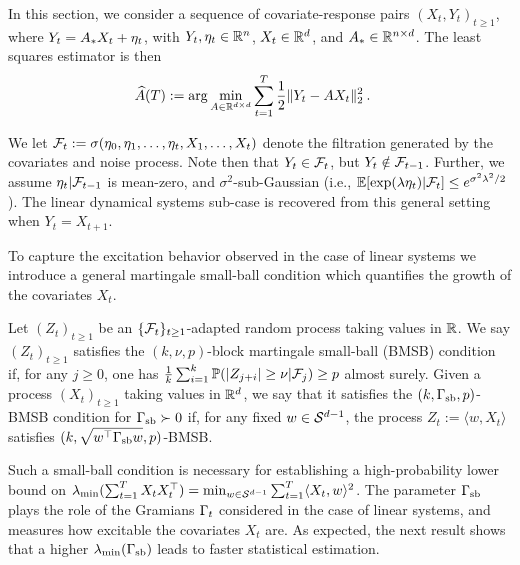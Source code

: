     In this section, we consider a sequence of covariate-response pairs $(X_t,Y_t)_{t \ge 1}$, where $Y_t = A_{*} X_t + \eta_t$, with $Y_t, \eta_t \in \mathbb{R}^n$, $X_t \in \mathbb{R}^d$, and $A_{*} \in \mathbb{R}^{n \times d}$. The least squares estimator is then
    \begin{eqnarray}
    \widehat{A}(T) &:= \arg\min_{A \in \mathbb{R}^{d \times d}} \sum_{t=1}^T \frac{1}{2}\|Y_{t} - A X_t\|_2^2 \:.
    \end{eqnarray}

    We let $\mathcal{F}_{t} := \sigma(\eta_0,\eta_1,\dots,\eta_{t},X_1,\dots,X_t)$ denote the filtration generated by the covariates and noise process. Note then that $Y_t \in \mathcal{F}_{t}$, but $Y_t \notin \mathcal{F}_{t - 1}$. Further, we assume $\eta_t | \mathcal{F}_{t-1}$ is mean-zero, and $\sigma^2$-sub-Gaussian (i.e., $\mathbb{E}[\exp(\lambda \eta_t) | \mathcal{F}_t] \le e^{\sigma^2 \lambda^2/2}$).
    The linear dynamical systems sub-case is recovered from this general setting when $Y_t = X_{t+1}$.

%
%

%
    To capture the excitation behavior observed in the case of linear systems we introduce a general martingale small-ball condition which quantifies the growth of the covariates $X_t$.
	\begin{defn}\label{def:bmsb} Let $(Z_t)_{t \ge 1}$ be an $\{\mathcal{F}_t\}_{t \ge 1}$-adapted random process  taking values in $\mathbb{R}$. We say $(Z_t)_{t\ge 1}$ satisfies the $(k,\nu,p)$-block martingale small-ball (BMSB) condition if, for any $j \ge 0$, one has $\frac{1}{k}\sum_{i=1}^k \mathbb{P}( |Z_{j+i}| \ge \nu | \mathcal{F}_{j}) \ge p$ almost surely.  Given a process $(X_t)_{t \ge 1}$ taking values in $\mathbb{R}^d$, we say that it satisfies the $(k,\Gamma_{\mathrm{sb}},p)$-BMSB condition for $\Gamma_{\mathrm{sb}} \succ 0$ if, for any fixed $w\in \mathcal{S}^{d-1}$, the process $Z_t:= \langle w, X_t\rangle$ satisfies $(k,\sqrt{w^\top \Gamma_{\mathrm{sb}} w},p)$-BMSB.
	\end{defn}

	Such a small-ball condition is necessary for establishing a high-probability lower bound on $\lambda_{\min}(\sum_{t=1}^T X_tX_t^\top) = \min_{w \in \mathcal{S}^{d-1}} \sum_{t=1}^T \langle X_t, w \rangle^2$. The parameter $\Gamma_{\mathrm{sb}}$ plays the role of the Gramians $\Gamma_t$ considered in the case of linear systems,
    and measures how excitable the covariates $X_t$ are. As expected, the next result shows that a higher $\lambda_{\min}(\Gamma_{\mathrm{sb}})$ leads to faster statistical estimation.

